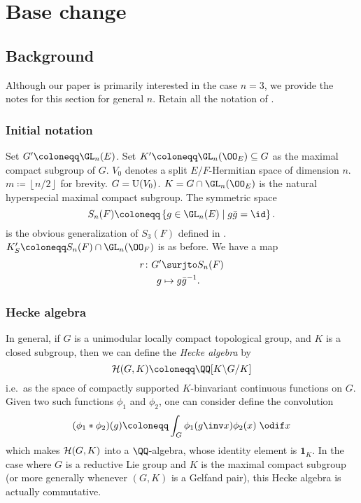 \chapter{Base change}
\section{Background}
Although our paper is primarily interested in the case $n=3$,
we provide the notes for this section for general $n$.
Retain all the notation of .

\subsection{Initial notation}
\begin{itemize}
  \ii Set $G' \coloneqq \GL_n(E)$.
  \ii Set $K' \coloneqq \GL_n(\OO_E) \subseteq G$ as the maximal compact subgroup of $G$.
  \ii $V_0$ denotes a split $E/F$-Hermitian space of dimension $n$.
  \ii $m \coloneqq \left\lfloor n/2 \right\rfloor$ for brevity.
  \ii $G = \operatorname{U}(V_0)$.
  \ii $K = G \cap \GL_n(\OO_E)$ is the natural hyperspecial maximal compact subgroup.
  \ii The symmetric space
  \[ S_n(F) \coloneqq \left\{ g \in \GL_n(E) \mid g \bar g = \id \right\}. \]
  is the obvious generalization of $S_3(F)$ defined in .
  \ii $K'_S \coloneqq S_n(F) \cap \GL_n(\OO_F)$ is as before.
  \ii We have a map
  \begin{align*}
    r \colon G' &\surjto S_n(F) \\
    g &\mapsto g\bar{g}^{-1}.
  \end{align*}
\end{itemize}

\subsection{Hecke algebra}
In general, if $G$ is a unimodular locally compact topological group,
and $K$ is a closed subgroup, then we can define the \emph{Hecke algebra} by
\[ \HH(G, K) \coloneqq \QQ[K \backslash G \slash K] \]
i.e.\ as the space of compactly supported $K$-binvariant continuous functions on $G$.
Given two such functions $\phi_1$ and $\phi_2$, one can consider define the convolution
\[ (\phi_1 \ast \phi_2)(g) \coloneqq \int_G \phi_1(g\inv x) \phi_2(x) \; \odif x \]
which makes $\mathcal H(G, K)$ into a $\QQ$-algebra,
whose identity element is $\mathbf{1}_K$.
In the case where $G$ is a reductive Lie group and
$K$ is the maximal compact subgroup
(or more generally whenever $(G,K)$ is a Gelfand pair),
this Hecke algebra is actually commutative.

